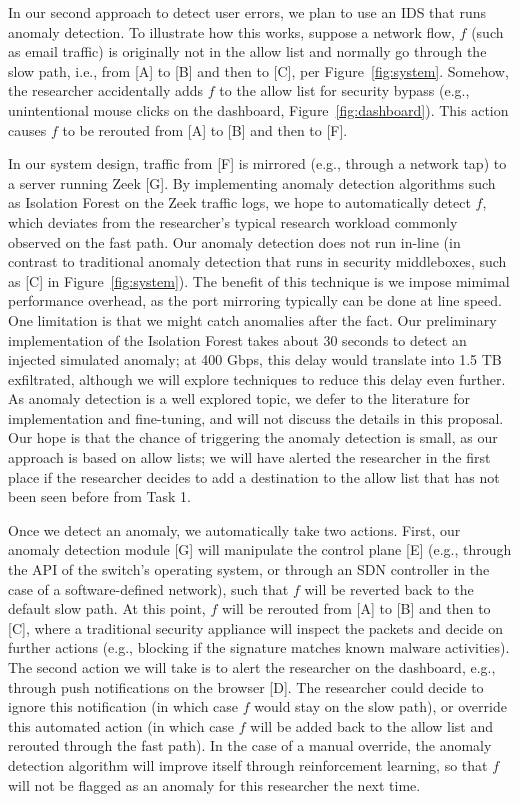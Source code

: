 In our second approach to detect user errors, we plan to use an IDS that runs anomaly detection. To illustrate how this works, suppose a network flow, $f$ (such as email traffic) is originally not in the allow list and normally go through the slow path, i.e., from [A] to [B] and then to [C], per Figure~\ref{fig:system}. Somehow, the researcher accidentally adds $f$ to the allow list for security bypass (e.g., unintentional mouse clicks on the dashboard, Figure~\ref{fig:dashboard}). This action causes $f$ to be rerouted from [A] to [B] and then to [F].

In our system design, traffic from [F] is mirrored (e.g., through a network tap) to a server running Zeek [G]. By implementing anomaly detection algorithms such as Isolation Forest on the Zeek traffic logs, we hope to automatically detect $f$, which deviates from the researcher's typical research workload commonly observed on the fast path. Our anomaly detection does not run in-line (in contrast to traditional anomaly detection that runs in security middleboxes, such as [C] in Figure~\ref{fig:system}). The benefit of this technique is we impose mimimal performance overhead, as the port mirroring typically can be done at line speed. One limitation is that we might catch anomalies after the fact. Our preliminary implementation of the Isolation Forest takes about 30 seconds to detect an injected simulated anomaly; at 400 Gbps, this delay would translate into 1.5 TB exfiltrated, although we will explore techniques to reduce this delay even further. As anomaly detection is a well explored topic, we defer to the literature for implementation and fine-tuning, and will not discuss the details in this proposal. Our hope is that the chance of triggering the anomaly detection is small, as our approach is based on allow lists;  we will have alerted the researcher in the first place if the researcher decides to add a destination to the allow list that has not been seen before from Task 1.

Once we detect an anomaly, we automatically take two actions. First, our anomaly detection module [G] will manipulate the control plane [E] (e.g., through the API of the switch's operating system, or through an SDN controller in the case of a software-defined network), such that $f$ will be reverted back to the default slow path. At this point, $f$ will be rerouted from [A] to [B] and then to [C], where a traditional security appliance will inspect the packets and decide on further actions (e.g., blocking if the signature matches known malware activities). The second action we will take is to alert the researcher on the dashboard, e.g., through push notifications on the browser [D]. The researcher could decide to ignore this notification (in which case $f$ would stay on the slow path), or override this automated action (in which case $f$ will be added back to the allow list and rerouted through the fast path). In the case of a manual override, the anomaly detection algorithm will improve itself through reinforcement learning, so that $f$ will not be flagged as an anomaly for this researcher the next time.

